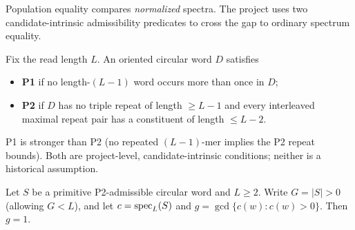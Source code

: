 Population equality compares \emph{normalized} spectra. The project uses two
candidate-intrinsic admissibility predicates to cross the gap to ordinary
spectrum equality.

\begin{definition}[P1 and P2]
\label{def:P1P2}
Fix the read length $L$. An oriented circular word $D$ satisfies
\begin{itemize}[leftmargin=*]
  \item \textbf{P1} if no length-$(L-1)$ word occurs more than once in $D$;
  \item \textbf{P2} if $D$ has no triple repeat of length $\ge L-1$ and every
        interleaved maximal repeat pair has a constituent of length
        $\le L-2$.
\end{itemize}
P1 is stronger than P2 (no repeated $(L-1)$-mer implies the P2 repeat bounds).
Both are project-level, candidate-intrinsic conditions; neither is a historical
assumption.
\end{definition}

\begin{lemma}
\label{lem:scaling}
Let $S$ be a primitive P2-admissible circular word and $L\ge2$.
Write $G=|S|>0$ (allowing $G<L$), and let
$c=\operatorname{spec}_L(S)$ and $g=\gcd\{c(w):c(w)>0\}$. Then $g=1$.
\end{lemma}

